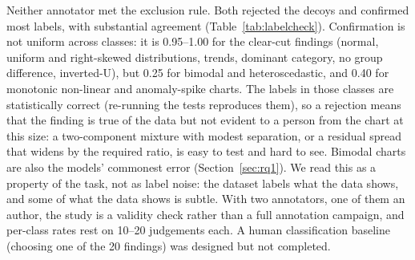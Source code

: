 Neither annotator met the exclusion rule. Both rejected the decoys and confirmed most
labels, with substantial agreement (Table~\ref{tab:labelcheck}). Confirmation is not uniform
across classes: it is 0.95--1.00 for the clear-cut findings (normal, uniform and right-skewed
distributions, trends, dominant category, no group difference, inverted-U), but 0.25 for
bimodal and heteroscedastic, and 0.40 for monotonic non-linear and anomaly-spike charts. The
labels in those classes are statistically correct (re-running the tests reproduces them), so
a rejection means that the finding is true of the data but not evident to a person from the
chart at this size: a two-component mixture with modest separation, or a residual spread
that widens by the required ratio, is easy to test and hard to see. Bimodal charts are also the
models' commonest error (Section~\ref{sec:rq1}). We read this as a property of the
task, not as label noise: the dataset labels what the data shows, and some of what the data
shows is subtle. With two annotators, one of them an author, the study is a validity check
rather than a full annotation campaign, and per-class rates rest on 10--20 judgements each.
A human classification baseline (choosing one of the 20 findings) was designed but not
completed.
